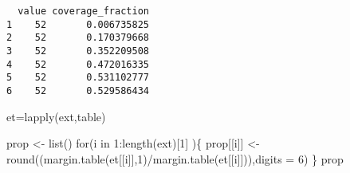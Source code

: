 \documentclass[
  letterpaper,
]{book}
\newenvironment{Shaded}{\begin{snugshade}}{\end{snugshade}}
\newcommand{\AttributeTok}[1]{\textcolor[rgb]{0.40,0.45,0.13}{#1}}
\newcommand{\ControlFlowTok}[1]{\textcolor[rgb]{0.00,0.23,0.31}{#1}}
\newcommand{\DecValTok}[1]{\textcolor[rgb]{0.68,0.00,0.00}{#1}}
\newcommand{\FunctionTok}[1]{\textcolor[rgb]{0.28,0.35,0.67}{#1}}
\newcommand{\NormalTok}[1]{\textcolor[rgb]{0.00,0.23,0.31}{#1}}
\newcommand{\OtherTok}[1]{\textcolor[rgb]{0.00,0.23,0.31}{#1}}
\newcommand{\SpecialCharTok}[1]{\textcolor[rgb]{0.37,0.37,0.37}{#1}}
\begin{document}
\begin{verbatim}
  value coverage_fraction
1    52       0.006735825
2    52       0.170379668
3    52       0.352209508
4    52       0.472016335
5    52       0.531102777
6    52       0.529586434
\end{verbatim}

\begin{Shaded}
\begin{Highlighting}[]
\NormalTok{et}\OtherTok{=}\FunctionTok{lapply}\NormalTok{(ext,table)}

\NormalTok{prop }\OtherTok{\textless{}{-}} \FunctionTok{list}\NormalTok{()}
\ControlFlowTok{for}\NormalTok{(i }\ControlFlowTok{in} \DecValTok{1}\SpecialCharTok{:}\FunctionTok{length}\NormalTok{(ext)[}\DecValTok{1}\NormalTok{] )\{}
\NormalTok{  prop[[i]] }\OtherTok{\textless{}{-}} \FunctionTok{round}\NormalTok{((}\FunctionTok{margin.table}\NormalTok{(et[[i]],}\DecValTok{1}\NormalTok{)}\SpecialCharTok{/}\FunctionTok{margin.table}\NormalTok{(et[[i]])),}\AttributeTok{digits =} \DecValTok{6}\NormalTok{)}
\NormalTok{\}}
\NormalTok{prop}
\end{Highlighting}
\end{Shaded}
\end{document}
